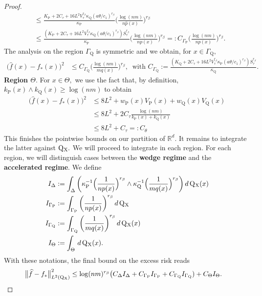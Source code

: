 \documentclass[10pt,a4paper]{amsart}
\renewcommand{\P}{\operatorname{P}}
\newcommand{\Q}{\operatorname{Q}}
\newcommand{\RR}{\mathbb{R}}
\renewcommand{\k}{\kappa}
\newcommand{\sX}{\mathrm{X}}
\newcommand{\wh}{\widehat}
\begin{document}
\begin{proof}
\begin{align*}
        &\leq \frac{K_{\P} + 2C_\tau + 16L^2V_\tau^{r_\beta}\k_{\Q}(a\theta/c_1)^{r_\beta}}{\k_{\P}}\bigg(\frac{\log(nm)}{n\wh p(x)}\bigg)^{r_\beta}\\
        &\leq \frac{(K_{\P} + 2C_\tau + 16L^2V_\tau^{r_\beta}\k_{\Q}(a\theta/c_1)^{r_\beta})S_\tau^{r_\beta}}{\k_{\P}}\bigg(\frac{\log(nm)}{n p(x)}\bigg)^{r_\beta}=: C_{\Gamma_{\P}}\bigg(\frac{\log(nm)}{np(x)}\bigg)^{r_\beta}.
    \end{align*}
    The analysis on the region $\Gamma_{\Q}$ is symmetric and we obtain, for $x \in \Gamma_{\Q},$
    \begin{align*}
        \big(\wh f(x) - f_*(x)\big)^2 &\leq C_{\Gamma_{\Q}}\bigg(\frac{\log(nm)}{mq(x)}\bigg)^{r_\beta}, \ \text{ with } C_{\Gamma_{\Q}} := \frac{(K_{\Q} + 2C_\tau + 16L^2V_\tau^{r_\beta}\k_{\P}(a\theta/c_1)^{r_\beta})S_\tau^{r_\beta}}{\k_{\Q}}.
    \end{align*}
    \noindent\textbf{Region $\Theta.$} For $x \in \Theta,$ we use the fact that, by definition, $k_{\P}(x)\wedge k_{\Q}(x) \geq \log(nm)$ to obtain
    \begin{align*}
        \big(\wh f(x) - f_*(x)\big)^2 &\leq 8L^2 + w_{\P}(x) V_{\P}(x) + w_{\Q}(x)V_{\Q}(x)\\
        &\leq 8L^2 + 2C_\tau \frac{\log (nm)}{k_{\P}(x) + k_{\Q}(x)}\\
        &\leq 8L^2 + C_\tau =: C_{\theta}
    \end{align*}
    This finishes the pointwise bounds on our partition of $\RR^d.$ It remains to integrate the latter against $\Q\mathstrut_{\!\sX}.$ We will proceed to integrate in each region. For each region, we will distinguish cases between the \textbf{wedge regime} and the \textbf{accelerated regime}. We define
    \begin{align*}
        I_{\Delta} &:= \int_{\Delta}\bigg(\k_{\P}^{-1}\Big(\frac{1}{np(x)}\Big)^{r_\beta}\wedge\k_{\Q}^{-1}\Big(\frac{1}{mq(x)}\Big)^{r_\beta}\bigg)\, d\Q\mathstrut_{\!\sX}(x)\\
        I_{\Gamma_{\P}} &:= \int_{\Gamma_{\P}}\bigg(\frac{1}{np(x)}\bigg)^{r_\beta}\, d\Q\mathstrut_{\!\sX}\\
        I_{\Gamma_{\Q}} &:= \int_{\Gamma_{\Q}}\bigg(\frac{1}{mq(x)}\bigg)^{r_\beta}\, d\Q\mathstrut_{\!\sX}(x)\\
        I_{\Theta} &:= \int_{\Theta}\, d\Q\mathstrut_{\!\sX}(x).
    \end{align*}
    With these notations, the final bound on the excess risk reads
    \begin{align*}
        \big\|\wh f - f_*\big\|_{L^2(\Q\mathstrut_{\!\sX})}^2 &\leq \log(nm)^{r_\beta}\big(C_{\Delta}I_{\Delta} + C_{\Gamma_{\P}}I_{\Gamma_{\P}} + C_{\Gamma_{\Q}}I_{\Gamma_{\Q}}) + C_{\Theta}I_{\Theta}.
    \end{align*}
    

\end{proof}
\end{document}
